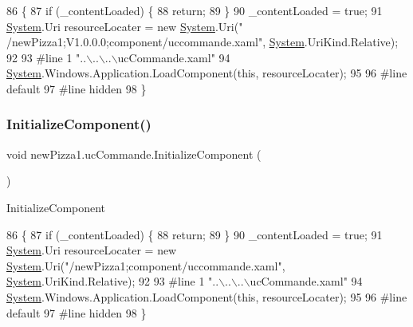 \begin{DoxyCode}
86                                           \{
87             \textcolor{keywordflow}{if} (\_contentLoaded) \{
88                 \textcolor{keywordflow}{return};
89             \}
90             \_contentLoaded = \textcolor{keyword}{true};
91             \hyperlink{namespaceSystem}{System}.Uri resourceLocater = \textcolor{keyword}{new} \hyperlink{namespaceSystem}{System}.Uri(\textcolor{stringliteral}{"
      /newPizza1;V1.0.0.0;component/uccommande.xaml"}, \hyperlink{namespaceSystem}{System}.UriKind.Relative);
92             
93 \textcolor{preprocessor}{            #line 1 "..\(\backslash\)..\(\backslash\)..\(\backslash\)ucCommande.xaml"}
94             \hyperlink{namespaceSystem}{System}.Windows.Application.LoadComponent(\textcolor{keyword}{this}, resourceLocater);
95             
96 \textcolor{preprocessor}{            #line default}
97 \textcolor{preprocessor}{            #line hidden}
98         \}
\end{DoxyCode}
\mbox{\label{classnewPizza1_1_1ucCommande_a3f6251cc87dd9f2a2db45c5413ce1711}} 
\subsubsection{\texorpdfstring{Initialize\+Component()}{InitializeComponent()}\hspace{0.1cm}{\footnotesize\ttfamily [6/6]}}
{\footnotesize\ttfamily void new\+Pizza1.\+uc\+Commande.\+Initialize\+Component (\begin{DoxyParamCaption}{ }\end{DoxyParamCaption})\hspace{0.3cm}{\ttfamily [inline]}}



Initialize\+Component 


\begin{DoxyCode}
86                                           \{
87             \textcolor{keywordflow}{if} (\_contentLoaded) \{
88                 \textcolor{keywordflow}{return};
89             \}
90             \_contentLoaded = \textcolor{keyword}{true};
91             \hyperlink{namespaceSystem}{System}.Uri resourceLocater = \textcolor{keyword}{new} \hyperlink{namespaceSystem}{System}.Uri(\textcolor{stringliteral}{"/newPizza1;component/uccommande.xaml"},
       \hyperlink{namespaceSystem}{System}.UriKind.Relative);
92             
93 \textcolor{preprocessor}{            #line 1 "..\(\backslash\)..\(\backslash\)..\(\backslash\)ucCommande.xaml"}
94             \hyperlink{namespaceSystem}{System}.Windows.Application.LoadComponent(\textcolor{keyword}{this}, resourceLocater);
95             
96 \textcolor{preprocessor}{            #line default}
97 \textcolor{preprocessor}{            #line hidden}
98         \}
\end{DoxyCode}


